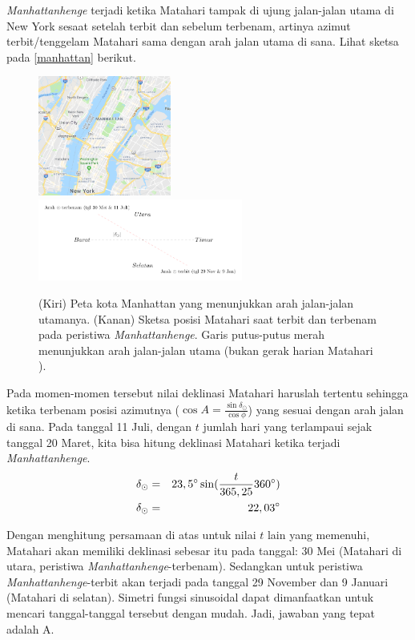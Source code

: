\documentclass[11pt,fleqn]{exam}
\begin{document}
\begin{questions}
\textit{Manhattanhenge} terjadi ketika Matahari tampak di ujung jalan-jalan utama di New York sesaat setelah terbit dan sebelum terbenam, artinya azimut terbit/tenggelam Matahari sama dengan arah jalan utama di sana. Lihat sketsa pada \autoref{manhattan} berikut.
\begin{figure}[H]
\centering
\includegraphics[width=0.39\textwidth]{manhattan.png}
\includegraphics[width=0.6\textwidth]{manhattanhenge.pdf}
\caption{(Kiri) Peta kota Manhattan yang menunjukkan arah jalan-jalan utamanya. (Kanan) Sketsa posisi Matahari saat terbit dan terbenam pada peristiwa \textit{Manhattanhenge}. Garis putus-putus merah menunjukkan arah jalan-jalan utama (bukan gerak harian Matahari \smiley{}).}
\label{manhattan}
\end{figure}

Pada momen-momen tersebut nilai deklinasi Matahari haruslah tertentu sehingga ketika terbenam posisi azimutnya ($\cos{A} = \frac{\sin{\delta_{\odot}}}{\cos{\phi}}$) yang sesuai dengan arah jalan di sana. Pada tanggal 11 Juli, dengan $t$ jumlah hari yang terlampaui sejak tanggal 20 Maret, kita bisa hitung deklinasi Matahari ketika terjadi \textit{Manhattanhenge}.
\begin{eqnarray*}
\delta_{\odot}&=&23,5\text{\degree}\sin (\frac{t}{365,25}360\text{\degree})\\
\delta_{\odot}&=&22,03\text{\degree}
\end{eqnarray*}

Dengan menghitung persamaan di atas untuk nilai $t$ lain yang memenuhi, Matahari akan memiliki deklinasi sebesar itu pada tanggal: 30 Mei (Matahari di utara, peristiwa \textit{Manhattanhenge}-terbenam). Sedangkan untuk peristiwa \textit{Manhattanhenge}-terbit akan terjadi pada tanggal 29 November dan 9 Januari (Matahari di selatan). Simetri fungsi sinusoidal dapat dimanfaatkan untuk mencari tanggal-tanggal tersebut dengan mudah. Jadi, jawaban yang tepat adalah A.




\end{questions}
\end{document}
